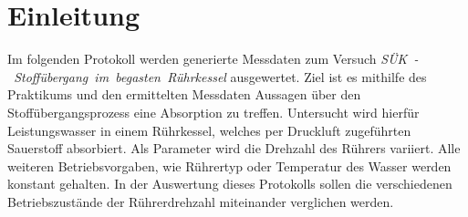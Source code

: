 %
\pagebreak
\section{Einleitung}
\label{sec:einleitung}
Im folgenden Protokoll werden generierte Messdaten zum Versuch \linebreak \mbox{\textit{SÜK - Stoffübergang im begasten Rührkessel}} ausgewertet. Ziel ist es mithilfe des Praktikums und den ermittelten Messdaten Aussagen über den Stoffübergangsprozess eine Absorption zu treffen. Untersucht wird hierfür Leistungswasser in einem Rührkessel, welches per Druckluft zugeführten Sauerstoff  absorbiert. Als Parameter wird die Drehzahl des Rührers variiert. Alle weiteren Betriebsvorgaben, wie Rührertyp oder Temperatur des Wasser werden konstant gehalten. In der Auswertung dieses Protokolls sollen die verschiedenen Betriebszustände der Rührerdrehzahl miteinander verglichen werden. 





